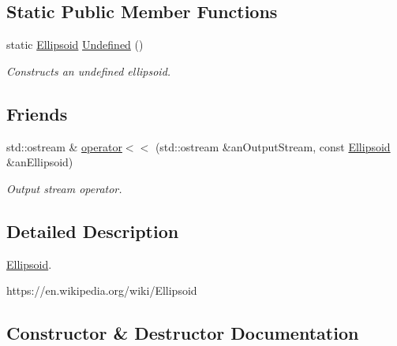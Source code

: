 \subsection*{Static Public Member Functions}
\begin{DoxyCompactItemize}
\item 
static \hyperlink{classlibrary_1_1math_1_1geom_1_1d3_1_1objects_1_1_ellipsoid}{Ellipsoid} \hyperlink{classlibrary_1_1math_1_1geom_1_1d3_1_1objects_1_1_ellipsoid_affcef36f736e6d21a0246a149b8fb688}{Undefined} ()
\begin{DoxyCompactList}\small\item\em Constructs an undefined ellipsoid. \end{DoxyCompactList}\end{DoxyCompactItemize}
\subsection*{Friends}
\begin{DoxyCompactItemize}
\item 
std\+::ostream \& \hyperlink{classlibrary_1_1math_1_1geom_1_1d3_1_1objects_1_1_ellipsoid_a95f4f6dc4d64843c673c7ac965468a2c}{operator$<$$<$} (std\+::ostream \&an\+Output\+Stream, const \hyperlink{classlibrary_1_1math_1_1geom_1_1d3_1_1objects_1_1_ellipsoid}{Ellipsoid} \&an\+Ellipsoid)
\begin{DoxyCompactList}\small\item\em Output stream operator. \end{DoxyCompactList}\end{DoxyCompactItemize}


\subsection{Detailed Description}
\hyperlink{classlibrary_1_1math_1_1geom_1_1d3_1_1objects_1_1_ellipsoid}{Ellipsoid}. 

https\+://en.wikipedia.\+org/wiki/\+Ellipsoid 

\subsection{Constructor \& Destructor Documentation}
\mbox{\label{classlibrary_1_1math_1_1geom_1_1d3_1_1objects_1_1_ellipsoid_aae81fe0edc7f0e8d4590ea89ae73cb14}} 
